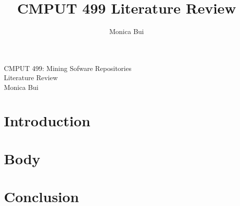 \documentclass{article}
\title{CMPUT 499 Literature Review}
\author{Monica Bui}
\begin{document}
\begin{titlepage}
    \centering
    \large
    \vspace{1cm}
    CMPUT 499: Mining Sofware Repositories \\
    \vspace{1cm}
    Literature Review \\
    \vspace{1cm}
    Monica Bui
\end{titlepage}



\newpage
\section{Introduction}

\newpage
\section{Body}


\newpage
\section{Conclusion}
\end{document}
